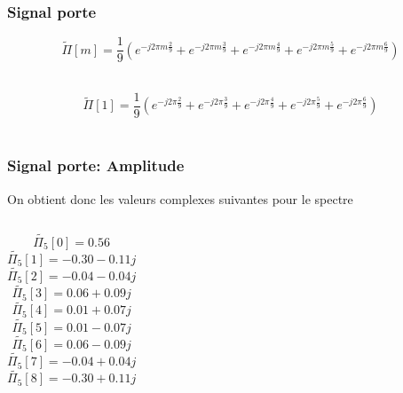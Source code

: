 \documentclass{beamer}
\begin{document}
\begin{frame}
\frametitle{Signal porte} 
\[  \tilde{\Pi}[m]  =    \frac{1}{9} ( e^{-j 2 \pi  m \frac{2}{9}} +  e^{-j 2 \pi  m \frac{3}{9}} +  e^{-j 2 \pi  m \frac{4}{9}} +  e^{-j 2 \pi  m \frac{5}{9}} + e^{-j 2 \pi  m \frac{6}{9}} ) \]\\
\vspace{0.3cm}

\[  \tilde{\Pi}[1]  =   \frac{1}{9} (  e^{-j 2 \pi   \frac{2}{9}} +  e^{-j 2 \pi   \frac{3}{9}} +  e^{-j 2 \pi   \frac{4}{9}} +  e^{-j 2 \pi   \frac{5}{9}} + e^{-j 2 \pi   \frac{6}{9}} ) \]\\
\vspace{0.3cm}


\end{frame}

\begin{frame}
\frametitle{Signal porte: Amplitude}
On obtient donc les valeurs complexes suivantes pour le spectre 
\begin{columns}
\column{60mm}
\[  \tilde{\Pi_5}[0]  =  0.56 \]
\[  \tilde{\Pi_5}[1]  =   -0.30 - 0.11j \]
\[  \tilde{\Pi_5}[2]  =   -0.04 - 0.04j \]
\[ \tilde{\Pi_5}[3]  =   0.06 + 0.09j \]
\[ \tilde{\Pi_5}[4]  =   0.01 + 0.07j \]
\[ \tilde{\Pi_5}[5]  =   0.01 - 0.07j \]
\[ \tilde{\Pi_5}[6]  =   0.06 - 0.09j \]
\[  \tilde{\Pi_5}[7]  =   -0.04 + 0.04j \]
\[ \tilde{\Pi_5}[8]  =   -0.30 + 0.11j \]
\column{60mm}

\end{columns}
\vspace{0.5cm}

\end{frame}
\end{document}
